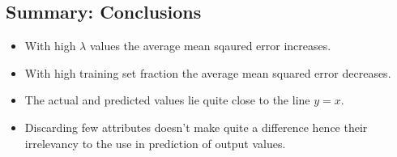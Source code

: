 \documentclass{article}
\begin{document}
\subsection*{Summary: Conclusions}
\begin{itemize}
\item With high $\lambda$ values the average mean sqaured error increases.
\item With high training set fraction the average mean squared error decreases.
\item The actual and predicted values lie quite close to the line $y=x$.
\item Discarding few attributes doesn't make quite a difference hence their irrelevancy to the use in prediction of output values.
\end{itemize}
\end{document}
